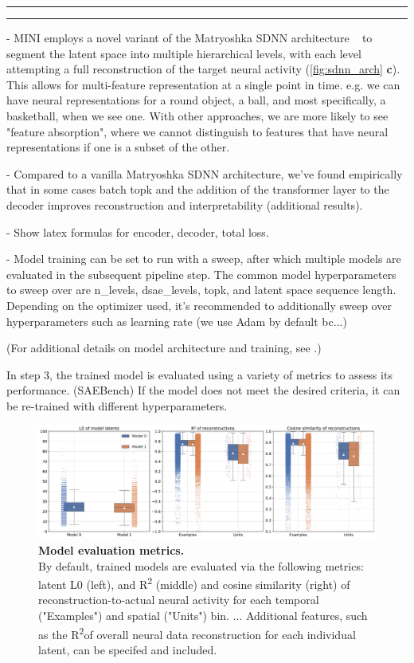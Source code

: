 \hrule
\hrule

- MINI employs a novel variant of the Matryoshka SDNN architecture ~\cite{bussmann_2025_msae} to segment the latent space into multiple hierarchical levels, with each level attempting a full reconstruction of the target neural activity (\autoref{fig:sdnn_arch} \textbf{c}). This allows for multi-feature representation at a single point in time. e.g. we can have neural representations for a round object, a ball, and most specifically, a basketball, when we see one. With other approaches, we are more likely to see "feature absorption", where we cannot distinguish to features that have neural representations if one is a subset of the other.

- Compared to a vanilla Matryoshka SDNN architecture, we've found empirically that in some cases batch topk and the addition of the transformer layer to the decoder improves reconstruction and interpretability (additional results).

- Show latex formulas for encoder, decoder, total loss.

- Model training can be set to run with a sweep, after which multiple models are evaluated in the subsequent pipeline step. The common model hyperparameters to sweep over are n\_levels, dsae\_levels, topk, and latent space sequence length. Depending on the optimizer used, it's recommended to additionally sweep over hyperparameters such as learning rate (we use Adam by default bc...)

(For additional details on model architecture and training, see .)

In step 3, the trained model is evaluated using a variety of metrics to assess its performance. (SAEBench) If the model does not meet the desired criteria, it can be re-trained with different hyperparameters. 

\begin{figure}[h]
    \centering
    \includegraphics[width=\linewidth]{figures/model_eval.pdf}
    \caption{
        \textbf{Model evaluation metrics.} \\
        \small By default, trained models are evaluated via the following metrics: latent L0 (left), and R\textsuperscript{2} (middle) and cosine similarity (right) of reconstruction-to-actual neural activity for each temporal ("Examples") and spatial ("Units") bin. ... Additional features, such as the R\textsuperscript{2}of overall neural data reconstruction for each individual latent, can be specifed and included.
    }
    \label{fig:model_eval}
\end{figure}

